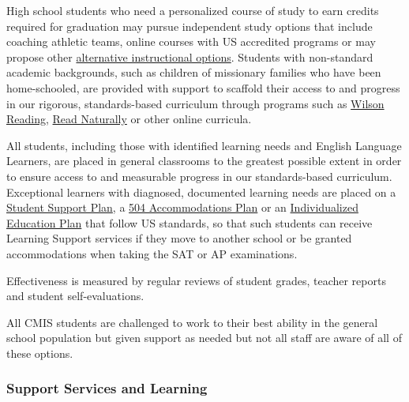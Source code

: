 
\begin{findings}
High school students who need a personalized course of study to earn credits required for graduation may pursue independent study options that include coaching athletic teams, online courses with US accredited programs or may propose other \href{http://www.ck12.org/}{alternative instructional options}. Students with non-standard academic backgrounds, such as children of missionary families who have been home-schooled, are provided with support to scaffold their access to and progress in our rigorous, standards-based curriculum through programs such as \href{http://www.wilsonlanguage.com/programs/wilson-reading-system/}{Wilson Reading}, \href{https://www.readnaturally.com/}{Read Naturally} or other online curricula.

All students, including those with identified learning needs and English Language Learners, are placed in general classrooms to the greatest possible extent in order to ensure access to and measurable progress in our standards-based curriculum. Exceptional learners with diagnosed, documented learning needs are placed on a \href{https://drive.google.com/drive/u/0/folders/0B_rFN7xA3AUNdlVaY2E1WGo1bUE}{Student Support Plan}, a \href{https://drive.google.com/drive/u/0/folders/0B_rFN7xA3AUNdlVaY2E1WGo1bUE}{504 Accommodations Plan} or an \href{https://drive.google.com/drive/u/0/folders/0B_rFN7xA3AUNdlVaY2E1WGo1bUE}{Individualized Education Plan} that follow US standards, so that such students can receive Learning Support services if they move to another school or be granted accommodations when taking the SAT or AP examinations. 

Effectiveness is measured by regular reviews of student grades, teacher reports and student self-evaluations.


All CMIS students are challenged to work to their best ability in the general school population but given support as needed but not all staff are aware of all of these options.
\end{findings}

\subsubsection{Support Services and Learning}

